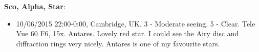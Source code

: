{\bf Sco, Alpha, Star}:
\begin{itemize}
\item 10/06/2015 22:00-0:00, Cambridge, UK. 3 - Moderate seeing, 5 - Clear. Tele Vue 60 F6, 15x. Antares. Lovely red star. I could see the Airy disc and diffraction rings very nicely. Antares is one of my favourite stars. 
\end{itemize}
